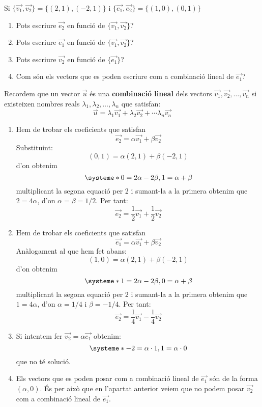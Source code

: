\Exercise Si $\{\overrightarrow{v_1},\overrightarrow{v_2}\} = \{ (2,1),(-2,1) \}$ i $\{\overrightarrow{e_1},\overrightarrow{e_2}\} = \{ (1,0),(0,1) \}$
\begin{enumerate}
  \item Pots escriure $\overrightarrow{e_2}$ en funció de $\{\overrightarrow{v_1},\overrightarrow{v_2}\}$?
  \item Pots escriure $\overrightarrow{e_1}$ en funció de $\{\overrightarrow{v_1},\overrightarrow{v_2}\}$?
  \item Pots escriure $\overrightarrow{v_2}$ en funció de $\{\overrightarrow{e_1}\}$?
  \item Com són els vectors que es poden escriure com a combinació lineal de $\overrightarrow{e_1}$?
\end{enumerate}

\Answer Recordem que un vector $\vec{u}$ és una {\bf combinació lineal} dels vectors $\overrightarrow{v_1},\overrightarrow{v_2}, \ldots , \overrightarrow{v_n}$ si existeixen nombres reals $\lambda_1, \lambda_2, \ldots, \lambda_n$ que satisfan:
\[\vec{u} = \lambda_1 \overrightarrow{v_1} + \lambda_2 \overrightarrow{v_2} + \cdots \lambda_n \overrightarrow{v_n}\]

\begin{enumerate}
  \item Hem de trobar els coeficients que satisfan 
  \[\vec{e_2} = \alpha \overrightarrow{v_1} + \beta \overrightarrow{v_2} \]
  Substituint:
  \[(0,1)=\alpha (2,1) + \beta (-2,1)\]
  d'on obtenim 
  \[
    \systeme*{0=2\alpha-2\beta, 1=\alpha+\beta}
  \]
  multiplicant la segona equació per 2 i sumant-la a la primera obtenim que $2=4\alpha$, d'on $\alpha=\beta=1/2$. Per tant:
  \[\vec{e_2} = \frac{1}{2} \overrightarrow{v_1} +\frac{1}{2} \overrightarrow{v_2} \]
  \item Hem de trobar els coeficients que satisfan 
  \[\vec{e_1} = \alpha \overrightarrow{v_1} + \beta \overrightarrow{v_2} \]
  Anàlogament al que hem fet abans:
  \[(1,0)=\alpha (2,1) + \beta (-2,1)\]
  d'on obtenim 
  \[
    \systeme*{1=2\alpha-2\beta, 0=\alpha+\beta}
  \]
  multiplicant la segona equació per 2 i sumant-la a la primera obtenim que $1=4\alpha$, d'on $\alpha=1/4$ i $\beta=-1/4$. Per tant:
  \[\vec{e_2} = \frac{1}{4} \overrightarrow{v_1} -\frac{1}{4} \overrightarrow{v_2} \]
  \item Si intentem fer $\overrightarrow{v_2} = \alpha \vec{e_1}$ obtenim:
  \[
    \systeme*{-2=\alpha\cdot 1, 1=\alpha\cdot 0}
  \]
  que no té solució. 
  \item Els vectors que es poden posar com a combinació lineal de $\vec{e_1}$ són de la forma $(\alpha,0)$. És per això que en l'apartat anterior veiem que no podem posar $\overrightarrow{v_2}$ com a combinació lineal de $\vec{e_1}$.
\end{enumerate}
\blacksquare

